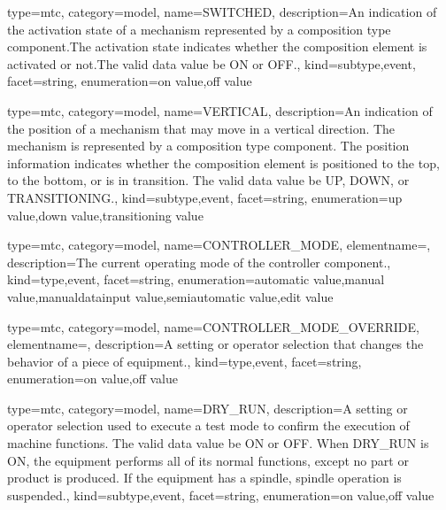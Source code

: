 {
  type=mtc,
  category=model,
  name={SWITCHED},
  description={An indication of the activation state of a mechanism represented by a \gls{composition} type component.The activation state indicates whether the \gls{composition} element is activated or not.The \gls{valid data value} \must be ON or OFF.},
  kind={subtype,event},
  facet={\gls{string}},
  enumeration={\gls{on value},\gls{off value}}
}


{
  type=mtc,
  category=model,
  name={VERTICAL},
  description={An indication of the position of a mechanism that may move in a vertical direction. The mechanism is represented by a \gls{composition} type component. \newline The position information indicates whether the \gls{composition} element is positioned to the top, to the bottom, or is in transition.  \newline The \gls{valid data value} \must be UP, DOWN, or TRANSITIONING.},
  kind={subtype,event},
  facet={\gls{string}},
  enumeration={\gls{up value},\gls{down value},\gls{transitioning value}}
}


{
  type=mtc,
  category=model,
  name={CONTROLLER\_MODE},
  elementname=,
  description={The current operating mode of the \gls{controller} component.},
  kind={type,event},
  facet={\gls{string}},
  enumeration={\gls{automatic value},\gls{manual value},\gls{manualdatainput value},\gls{semiautomatic value},\gls{edit value}}
}


{
  type=mtc,
  category=model,
  name={CONTROLLER\_MODE\_OVERRIDE},
  elementname=,
  description={A setting or operator selection that changes the behavior of a piece of equipment.},
  kind={type,event},
  facet={\gls{string}},
  enumeration={\gls{on value},\gls{off value}}
}


{
  type=mtc,
  category=model,
  name={DRY\_RUN},
  description={A setting or operator selection used to execute a test mode to confirm the execution of machine functions.  The \gls{valid data value} \must be ON or OFF. \newline When DRY\_RUN is ON, the equipment performs all of its normal functions, except no part or product is produced.  If the equipment has a spindle, spindle operation is suspended.},
  kind={subtype,event},
  facet={\gls{string}},
  enumeration={\gls{on value},\gls{off value}}
}



